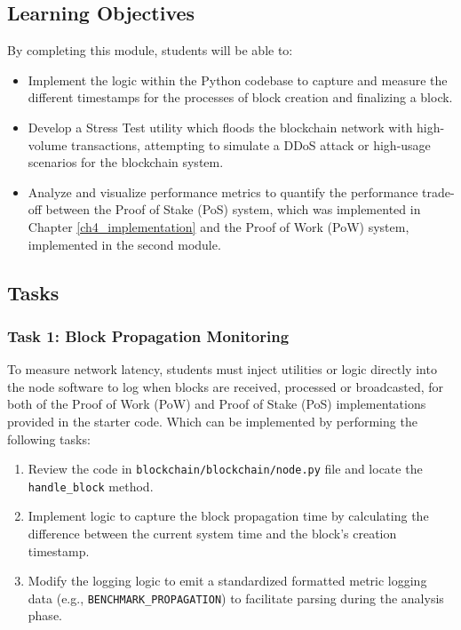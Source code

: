 \subsection{Learning Objectives}
By completing this module, students will be able to:
\begin{itemize}
    \item Implement the logic within the Python codebase to capture and measure the different timestamps for the processes of block creation and finalizing a block.
    \item Develop a Stress Test utility which floods the blockchain network with high-volume transactions, attempting to simulate a DDoS attack or high-usage scenarios for the blockchain system.
    \item Analyze and visualize performance metrics to quantify the performance trade-off between the Proof of Stake (PoS) system, which was implemented in Chapter \ref{ch4_implementation} and the Proof of Work (PoW) system, implemented in the second module.    
\end{itemize}


\newpage

\subsection{Tasks}

\subsubsection*{Task 1: Block Propagation Monitoring} 
To measure network latency, students must inject utilities or logic directly into the node software to log when blocks are received, processed or broadcasted, for both of the Proof of Work (PoW) and Proof of Stake (PoS) implementations provided in the starter code. Which can be implemented by performing the following tasks:

\begin{enumerate}
    \item Review the code in \texttt{blockchain/blockchain/node.py} file and locate the\\ \texttt{handle\_block} method.
    \item Implement logic to capture the block propagation time by calculating the difference between the current system time and the block's creation timestamp.
    \item Modify the logging logic to emit a standardized formatted metric logging data (e.g., \texttt{BENCHMARK\_PROPAGATION}) to facilitate parsing during the analysis phase.
\end{enumerate}

